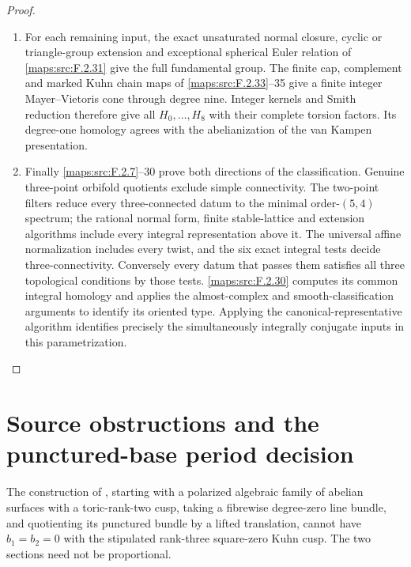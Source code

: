 \begin{proof}
\begin{enumerate}[label={$\langle1\rangle$\arabic*.}]
\item For each remaining input, the exact unsaturated normal
closure, cyclic or triangle-group extension and exceptional
spherical Euler relation of \ref{maps:src:F.2.31} give the full fundamental
group.  The finite cap, complement and marked Kuhn chain
maps of \ref{maps:src:F.2.33}--35 give a finite integer Mayer--Vietoris cone
through degree nine.  Integer kernels and Smith reduction
therefore give all $H_0,\ldots,H_8$ with their complete
torsion factors. Its degree-one homology agrees with the
abelianization of the van Kampen presentation.

\item Finally \ref{maps:src:F.2.7}--30 prove both directions of the classification.  Genuine three-point orbifold quotients
exclude simple connectivity.  The two-point filters reduce
every three-connected datum to the minimal order-$(5,4)$ spectrum; the
rational normal form, finite stable-lattice and extension
algorithms include every integral representation above it.
The universal affine normalization includes every twist,
and the six exact integral tests decide three-connectivity. Conversely every datum that passes them satisfies all three
topological conditions by those tests.  \ref{maps:src:F.2.30} computes
its common integral homology and applies the almost-complex
and smooth-classification arguments to identify its oriented
type. Applying the canonical-representative algorithm identifies
precisely the simultaneously integrally conjugate inputs in this
parametrization.

\end{enumerate}
\end{proof}




\section{Source obstructions and the punctured-base period decision}



\begin{theorem}\hypertarget{tag-02O6}{}\label{maps:src:F.3.4}


The construction of \cite{E26}, starting with a polarized
algebraic family of abelian surfaces with a toric-rank-two cusp,
taking a fibrewise degree-zero line bundle, and quotienting its
punctured bundle by a lifted translation, cannot have $b_1=b_2=0$
with the stipulated rank-three square-zero Kuhn cusp.
The two sections need not be proportional.

\end{theorem}


